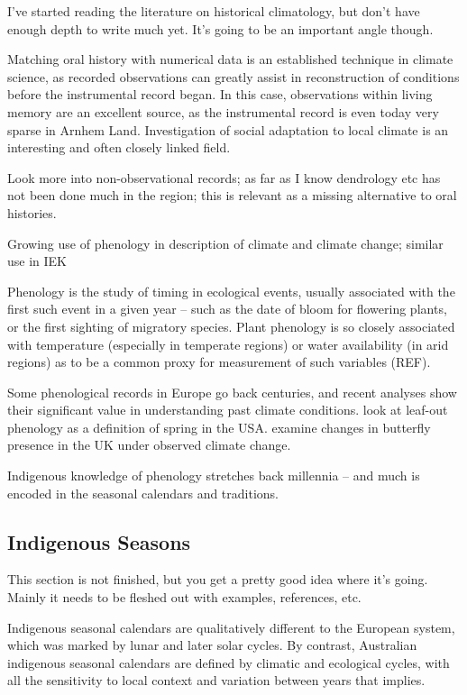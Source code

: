 I've started reading the literature on historical climatology, but don't have 
enough depth to write much yet.  It's going to be an important angle though. 

Matching oral history with numerical data is an established technique in 
climate science, as recorded observations can greatly assist in reconstruction 
of conditions before the instrumental record began.  In this case, observations 
within living memory are an excellent source, as the instrumental record is 
even today very sparse in Arnhem Land.  Investigation of social adaptation to 
local climate is an interesting and often closely linked field.

Look more into non-observational records; as far as I know dendrology etc has 
not been done much in the region; this is relevant as a missing alternative to 
oral histories.

Growing use of phenology in description of climate and climate change; similar 
use in IEK

Phenology is the study of timing in ecological events, usually associated with 
the first such event in a given year – such as the date of bloom for flowering 
plants, or the first sighting of migratory species.  Plant phenology is so 
closely associated with temperature (especially in temperate regions) or water 
availability (in arid regions) as to be a common proxy for measurement of such 
variables (REF).

Some phenological records in Europe go back centuries, and recent analyses show 
their significant value in understanding past climate conditions.
\citet{allstadt2015} look at leaf-out phenology as a definition of spring 
in the USA.  \citet{menzel2006} examine changes in butterfly presence in the
UK under observed climate change.

Indigenous knowledge of phenology stretches back millennia – and much is 
encoded in the seasonal calendars and traditions.


\subsection{Indigenous Seasons}
This section is not finished, but you get a pretty good idea where it's 
going.  Mainly it needs to be fleshed out with examples, references, etc. 

Indigenous seasonal calendars are qualitatively different to the European 
system, which was marked by lunar and later solar cycles.  By contrast, 
Australian indigenous seasonal calendars are defined by climatic and ecological 
cycles, with all the sensitivity to local context and variation between years 
that implies.

